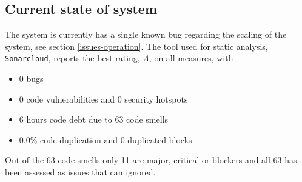 \subsection{Current state of system}
The system is currently has a single known bug regarding the scaling of the system, see section \ref{issues-operation}. The tool used for static analysis, \texttt{Sonarcloud}, reports the best rating, \textit{A}, on all measures, with 

\begin{itemize}
    \item 0 bugs
    \item 0 code vulnerabilities and 0 security hotspots
    \item 6 hours code debt due to 63 code smells
    \item 0.0\% code duplication and 0 duplicated blocks
\end{itemize}

Out of the 63 code smells only 11 are major, critical or blockers and all 63 has been assessed as issues that can ignored.

